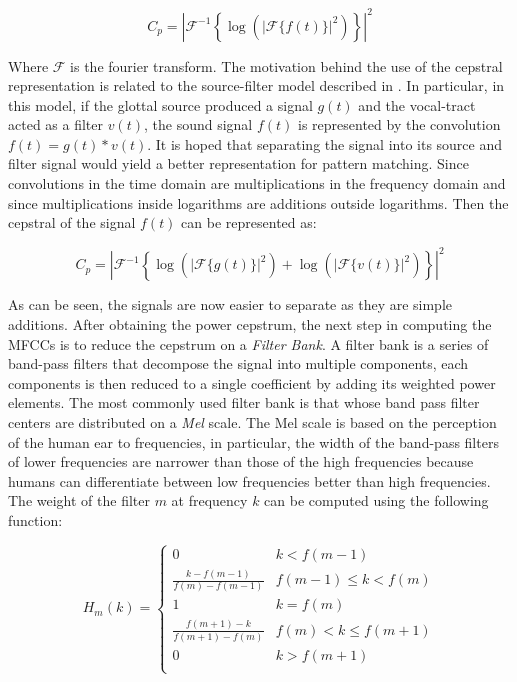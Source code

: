 \documentclass[twocolumn]{article}
\begin{document}
\begin{equation}
C_{p} = \left|{\mathcal{F}}^{-1}\left\{
        \log\left(\left|{\mathcal{F}}\{f(t)\}\right|^{2}\right)
        \right\}\right|^{2}
\end{equation}

Where $\mathcal{F}$ is the fourier transform. The motivation behind the use of
the cepstral representation is related to the source-filter model described in
\autocite{Degottex2010}. In particular, in this model, if the glottal source
produced a signal $g(t)$ and the vocal-tract acted as a filter $v(t)$, the
sound signal $f(t)$ is represented by the convolution $f(t) = g(t)*v(t)$. It is
hoped that separating the signal into its source and filter signal would yield
a better representation for pattern matching. Since convolutions in the time
domain are multiplications in the frequency domain and since multiplications
inside logarithms are additions outside logarithms. Then the cepstral of the
signal $f(t)$ can be represented as:

\begin{equation}
C_{p} = \left|{\mathcal{F}}^{-1}\left\{
        \log\left(\left|{\mathcal{F}}\{g(t)\}\right|^{2}\right) +
        \log\left(\left|{\mathcal{F}}\{v(t)\}\right|^{2}\right)
        \right\}\right|^{2}
\end{equation}

As can be seen, the signals are now easier to separate as they are simple
additions. After obtaining the power cepstrum, the next step in computing the
MFCCs is to reduce the cepstrum on a \emph{Filter Bank}. A filter bank is a
series of band-pass filters that decompose the signal into multiple components,
each components is then reduced to a single coefficient by adding its weighted
power elements. The most commonly used filter bank is that whose band pass
filter centers are distributed on a \emph{Mel} scale. The Mel scale is based on
the perception of the human ear to frequencies, in particular, the width of the
band-pass filters of lower frequencies are narrower than those of the high
frequencies because humans can differentiate between low frequencies better
than high frequencies. The weight of the filter $m$ at frequency $k$ can be
computed using the following function:

\begin{equation}
H_{m}(k) =
\begin{cases}
0 & k < f(m - 1) \\
\frac{k - f(m - 1)}{f(m) - f(m - 1)} & f(m - 1) \leq k < f(m) \\ 
1 & k = f(m) \\
\frac{f(m + 1) - k}{f(m + 1) - f(m)} & f(m) < k \leq f(m + 1) \\ 
0 & k > f(m + 1) \\
\end{cases}
\end{equation}
\end{document}
